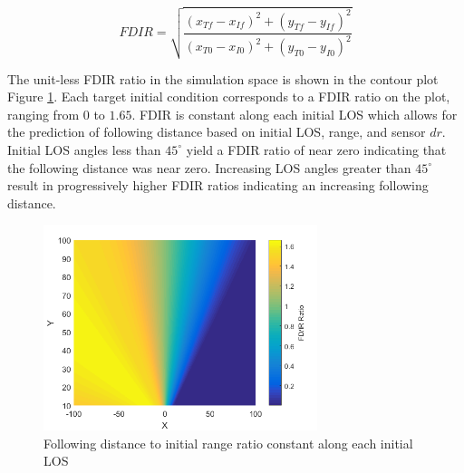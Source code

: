 \documentclass[conference]{IEEEtran}
\begin{document}

\begin{equation} 
\label{eq:FDIR}
FDIR = \sqrt{\frac{(x_{Tf}-x_{If})^2+(y_{Tf}-y_{If})^2}{(x_{T0}-x_{I0})^2+(y_{T0}-y_{I0})^2}}
\end{equation}

The unit-less FDIR ratio in the simulation space is shown in the contour plot Figure \ref{fig:Rays}. Each target initial condition corresponds to a FDIR ratio on the plot, ranging from $0$ to $1.65$. FDIR is constant along each initial LOS which allows for the prediction of following distance based on initial LOS, range, and sensor $dr$. Initial LOS angles less than $45^{\circ}$ yield a FDIR ratio of near zero indicating that the following distance was near zero. Increasing LOS angles greater than $45^{\circ}$ result in progressively higher FDIR ratios indicating an increasing following distance.





\begin{figure}[H]
	\centering
	\includegraphics[width=8cm]{FDIR_Rays.png}
	\caption{Following distance to initial range ratio constant along each initial LOS}
	\label{fig:Rays}
\end{figure}
\end{document}
